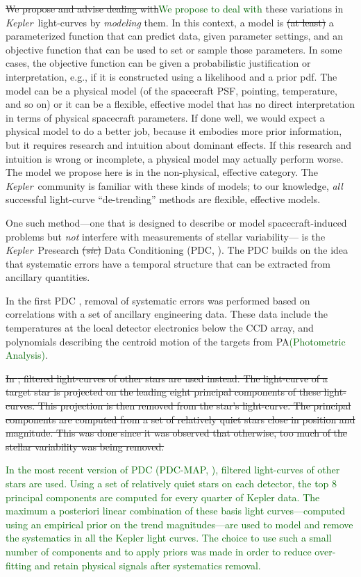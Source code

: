 \documentclass[12pt, preprint]{aastex}
\newcommand{\notenglish}[1]{\textit{#1}}
\newcommand{\sic}{\notenglish{sic}}
\newcommand{\project}[1]{\textsl{#1}}
\newcommand{\Kepler}{\project{Kepler}}
\newcommand{\revise}[1]{\textcolor{darkgreen}{#1}}
\newcommand{\remove}[1]{\sout{#1}}
\begin{document}
\remove{We propose and advise dealing with}\revise{We propose to deal with} these variations in \Kepler\ light-curves by \emph{modeling} them.
In this context, a model is \remove{(at least)} a parameterized function that can predict data, given parameter settings,
  and an objective function that can be used to set or sample those parameters.
In some cases, the objective function can be given a probabilistic justification or interpretation, e.g., if it is constructed using a likelihood and a prior pdf.
The model can be a physical model (of the spacecraft PSF, pointing, temperature, and so on)
  or it can be a flexible, effective model that has no direct interpretation in terms of physical spacecraft parameters.
If done well, we would expect a physical model to do a better job,
  because it embodies more prior information,
  but it requires research and intuition about dominant effects. 
If this research and intuition is wrong or incomplete, a physical model may actually perform worse.
The model we propose here is in the non-physical, effective category.
The \Kepler\ community is familiar with these kinds of models;
  to our knowledge, \emph{all} successful light-curve ``de-trending'' methods
  are flexible, effective models.

One such method---one that is designed to describe or model spacecraft-induced problems
  but \emph{not} interfere with measurements of stellar variability---%
  is the \Kepler\ Presearch \remove{(\sic)} Data Conditioning (PDC, \citealt{pdc1}).
The PDC builds on the idea that systematic errors have a temporal structure that can be extracted from ancillary quantities. 

In the first PDC \citep{pdc1}, 
  removal of systematic errors was performed based on correlations with a set of ancillary engineering data. 
These data include the temperatures at the local detector electronics below the CCD array, 
  and polynomials describing the centroid motion of the targets from PA\revise{(Photometric Analysis)}.

\remove{In \cite{pdc2,pdc3}, filtered light-curves of other stars are used instead. 
The light-curve of a target star is projected on the leading eight principal components of these light-curves. 
This projection is then removed from the star's light-curve. 
The principal components are computed from a set of relatively quiet stars close in position and magnitude. 
This was done since it was observed that otherwise, too much of the stellar variability was being removed.}

\revise{In the most recent version of PDC (PDC-MAP, \citealt{pdc2,pdc3}), filtered light-curves of other stars are used. Using a set of relatively quiet stars on each detector, the
top 8 principal components are computed for every quarter of Kepler
data. The maximum a posteriori linear combination of these basis light
curves---computed using an empirical prior on the trend
magnitudes---are used to model and remove the systematics in all the
Kepler light curves. The choice to use such a small number of
components and to apply priors was made in order to reduce
over-fitting and retain physical signals after systematics removal.}
\end{document}
